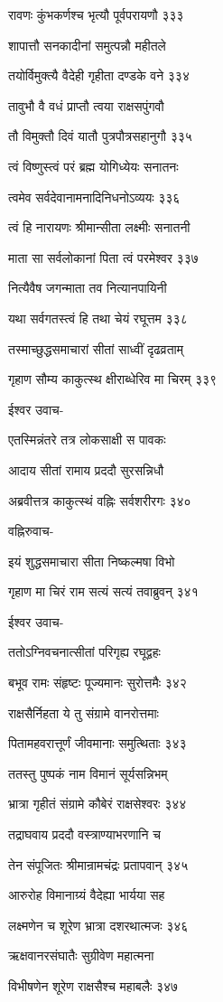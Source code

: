 रावणः कुंभकर्णश्च भृत्यौ पूर्वपरायणौ ३३३

शापात्तौ सनकादीनां समुत्पन्नौ महीतले

तयोर्विमुक्त्यै वैदेही गृहीता दण्डके वने ३३४

तावुभौ वै वधं प्राप्तौ त्वया राक्षसपुंगवौ

तौ विमुक्तौ दिवं यातौ पुत्रपौत्रसहानुगौ ३३५

त्वं विष्णुस्त्वं परं ब्रह्म योगिध्येयः सनातनः

त्वमेव सर्वदेवानामनादिनिधनोऽव्ययः ३३६

त्वं हि नारायणः श्रीमान्सीता लक्ष्मीः सनातनी

माता सा सर्वलोकानां पिता त्वं परमेश्वर ३३७

नित्यैवैष जगन्माता तव नित्यानपायिनी

यथा सर्वगतस्त्वं हि तथा चेयं रघूत्तम ३३८

तस्माच्छुद्धसमाचारां सीतां साध्वीं दृढव्रताम्

गृहाण सौम्य काकुत्स्थ क्षीराब्धेरिव मा चिरम् ३३९

ईश्वर उवाच-

एतस्मिन्नंतरे तत्र लोकसाक्षी स पावकः

आदाय सीतां रामाय प्रददौ सुरसन्निधौ

अब्रवीत्तत्र काकुत्स्थं वह्निः सर्वशरीरगः ३४०

वह्निरुवाच-

इयं शुद्धसमाचारा सीता निष्कल्मषा विभो

गृहाण मा चिरं राम सत्यं सत्यं तवाब्रुवन् ३४१

ईश्वर उवाच-

ततोऽग्निवचनात्सीतां परिगृह्य रघूद्वहः

बभूव रामः संहृष्टः पूज्यमानः सुरोत्तमैः ३४२

राक्षसैर्निहता ये तु संग्रामे वानरोत्तमाः

पितामहवरात्तूर्णं जीवमानाः समुत्थिताः ३४३

ततस्तु पुष्पकं नाम विमानं सूर्यसन्निभम्

भ्रात्रा गृहीतं संग्रामे कौबेरं राक्षसेश्वरः ३४४

तद्राघवाय प्रददौ वस्त्राण्याभरणानि च

तेन संपूजितः श्रीमान्रामचंद्रः प्रतापवान् ३४५

आरुरोह विमानाग्र्यं वैदेह्या भार्यया सह

लक्ष्मणेन च शूरेण भ्रात्रा दशरथात्मजः ३४६

ऋक्षवानरसंघातैः सुग्रीवेण महात्मना

विभीषणेन शूरेण राक्षसैश्च महाबलैः ३४७

